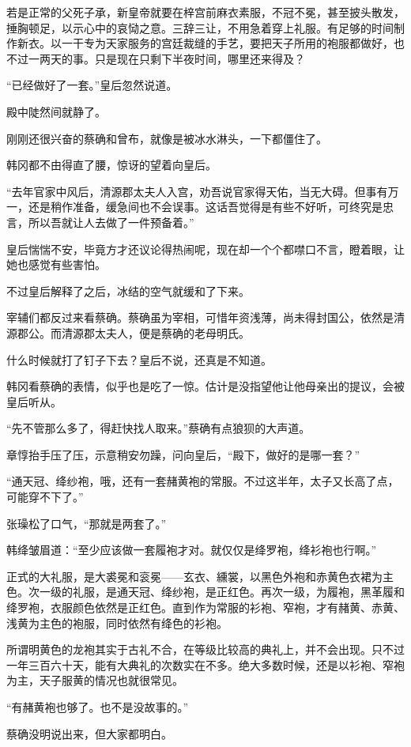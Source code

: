 若是正常的父死子承，新皇帝就要在梓宫前麻衣素服，不冠不冕，甚至披头散发，捶胸顿足，以示心中的哀恸之意。三辞三让，不用急着穿上礼服。有足够的时间制作新衣。以一干专为天家服务的宫廷裁缝的手艺，要把天子所用的袍服都做好，也不过一两天的事。只是现在只剩下半夜时间，哪里还来得及？

“已经做好了一套。”皇后忽然说道。

殿中陡然间就静了。

刚刚还很兴奋的蔡确和曾布，就像是被冰水淋头，一下都僵住了。

韩冈都不由得直了腰，惊讶的望着向皇后。

“去年官家中风后，清源郡太夫人入宫，劝吾说官家得天佑，当无大碍。但事有万一，还是稍作准备，缓急间也不会误事。这话吾觉得是有些不好听，可终究是忠言，所以吾就让人去做了一件预备着。”

皇后惴惴不安，毕竟方才还议论得热闹呢，现在却一个个都噤口不言，瞪着眼，让她也感觉有些害怕。

不过皇后解释了之后，冰结的空气就缓和了下来。

宰辅们都反过来看蔡确。蔡确虽为宰相，可惜年资浅薄，尚未得封国公，依然是清源郡公。而清源郡太夫人，便是蔡确的老母明氏。

什么时候就打了钉子下去？皇后不说，还真是不知道。

韩冈看蔡确的表情，似乎也是吃了一惊。估计是没指望他让他母亲出的提议，会被皇后听从。

“先不管那么多了，得赶快找人取来。”蔡确有点狼狈的大声道。

章惇抬手压了压，示意稍安勿躁，问向皇后，“殿下，做好的是哪一套？”

“通天冠、绛纱袍，哦，还有一套赭黄袍的常服。不过这半年，太子又长高了点，可能穿不下了。”

张璪松了口气，“那就是两套了。”

韩绛皱眉道：“至少应该做一套履袍才对。就仅仅是绛罗袍，绛衫袍也行啊。”

正式的大礼服，是大裘冕和衮冕——玄衣、纁裳，以黑色外袍和赤黄色衣裙为主色。次一级的礼服，是通天冠、绛纱袍，是正红色。再次一级，为履袍，黑革履和绛罗袍，衣服颜色依然是正红色。直到作为常服的衫袍、窄袍，才有赭黄、赤黄、浅黄为主色的袍服，同时依然有绛色的衫袍。

所谓明黄色的龙袍其实于古礼不合，在等级比较高的典礼上，并不会出现。只不过一年三百六十天，能有大典礼的次数实在不多。绝大多数时候，还是以衫袍、窄袍为主，天子服黄的情况也就很常见。

“有赭黄袍也够了。也不是没故事的。”

蔡确没明说出来，但大家都明白。

